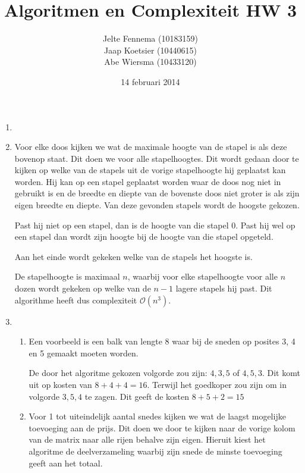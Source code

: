 \documentclass[11pt]{article}
\title{\textbf{Algoritmen en Complexiteit HW 3}}
\author{Jelte Fennema (10183159)\\
		Jaap Koetsier (10440615)\\
        Abe Wiersma (10433120)}
\date{14 februari 2014}
\newcommand{\bigO}{\ensuremath{\mathcal{O}}}
\begin{document}
\maketitle

\begin{enumerate}
    \item

    \item
        Voor elke doos kijken we wat de maximale hoogte van de stapel is als
        deze bovenop staat. Dit doen we voor alle stapelhoogtes. Dit wordt
        gedaan door te kijken op welke van de stapels uit de vorige stapelhoogte
        hij geplaatst kan worden. Hij kan op een stapel geplaatst worden waar de
        doos nog niet in gebruikt is en de breedte en diepte van de bovenste
        doos niet groter is als zijn eigen breedte en diepte. Van deze gevonden
        stapels wordt de hoogste gekozen.

        Past hij niet op een stapel, dan is de hoogte van die stapel 0. Past hij
        wel op een stapel dan wordt zijn hoogte bij de hoogte van die stapel
        opgeteld.

        Aan het einde wordt gekeken welke van de stapels het hoogste is.

        De stapelhoogte is maximaal $n$, waarbij voor elke stapelhoogte voor
        alle $n$ dozen wordt gekeken op welke van de $n - 1$ lagere stapels hij
        past. Dit algorithme heeft dus complexiteit \bigO$(n^3)$.

    \item
        \begin{enumerate}
            \item
                Een voorbeeld is een balk van lengte 8 waar bij de sneden op
                posites 3, 4 en 5 gemaakt moeten worden.

                De door het algoritme gekozen volgorde zou zijn: $4, 3, 5$ of
                $4, 5, 3$. Dit komt uit op kosten van $8+4+4=16$. Terwijl het
                goedkoper zou zijn om in volgorde $3, 5, 4$ te zagen. Dit geeft
                de kosten $8+5+2=15$

            \item
                Voor 1 tot uiteindelijk aantal snedes kijken we wat de
                laagst mogelijke toevoeging aan de prijs. Dit doen we door te
                kijken naar de vorige kolom van de matrix naar alle rijen
                behalve zijn eigen. Hieruit kiest het algoritme de
                deelverzameling waarbij zijn snede de minste toevoeging geeft
                aan het totaal.
        \end{enumerate}


\end{enumerate}
\end{document}
